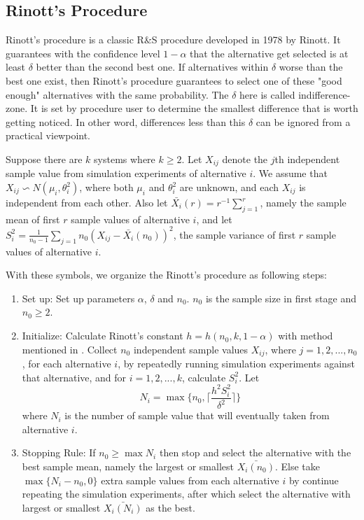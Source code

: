 \documentclass[12pt,a4]{report}
\begin{document}
\subsection{Rinott's Procedure}

Rinott's procedure is a classic R\&S procedure developed in 1978 by Rinott. It guarantees with the confidence level $1 - \alpha$ that the alternative get selected is at least $\delta$ better than the second best one. If alternatives within $\delta$ worse than the best one exist, then Rinott's procedure guarantees to select one of these "good enough" alternatives with the same probability. The $\delta$ here is called indifference-zone. It is set by procedure user to determine the smallest difference that is worth getting noticed. In other word, differences less than this $\delta$ can be ignored from a practical viewpoint.

Suppose there are $k$ systems where $k \geqslant 2$. Let $X_{ij}$ denote the $j$th independent sample value from simulation experiments of alternative $i$. We assume that $X_{ij} \backsim N(\mu_i, \theta_i^2)$, where both $\mu_i$ and $\theta_i^2$ are unknown, and each $X_{ij}$ is independent from each other. Also let $\bar{X_i}(r) = r^{-1}\sum_{j=1}^r$, namely the sample mean of first $r$ sample values of alternative $i$, and let $S_i^2 = \frac{1}{n_0 - 1}\sum_{j=1}{n_0}(X_{ij} - \bar{X_i}(n_0))^2$, the sample variance of first $r$ sample values of alternative $i$.

With these symbols, we organize the Rinott's procedure as following steps:

\begin{enumerate}
\item{Set up: } Set up parameters $\alpha$, $\delta$ and $n_0$. $n_0$ is the sample size in first stage and $n_0 \geqslant 2$.
\item{Initialize: } Calculate Rinott's constant $h = h(n_0, k, 1 - \alpha)$ with method mentioned in \cite{rinott-constant}. Collect $n_0$ independent sample values $X_{ij}$, where $j = 1, 2,...,n_0$, for each alternative $i$, by repeatedly running simulation experiments against that alternative, and for $i = 1, 2,...,k$, calculate $S_i^2$. Let 
$$ N_i = \max\{n_0, \lceil \frac{h^2S_i^2}{\delta^2} \rceil\} $$ where $N_i$ is the number of sample value that will eventually taken from alternative $i$.
\item{Stopping Rule: } If $n_0 \geqslant \max N_i$ then stop and select the alternative with the best sample mean, namely the largest or smallest $\bar{X_i(n_0)}$. Else take $\max\{N_i - n_0, 0\}$ extra sample values from each alternative $i$ by continue repeating the simulation experiments, after which select the alternative with largest or smallest $\bar{X_i(N_i)}$ as the best.
\end{enumerate}
\end{document}
